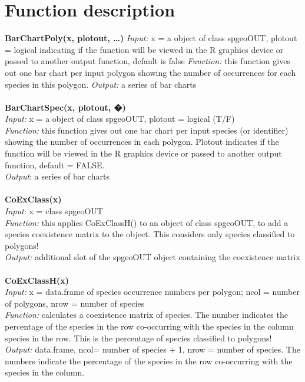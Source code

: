 \documentclass[a4paper,titlepage,11pt]{scrreprt}
\begin{document}
\chapter{Function description}
\textbf{BarChartPoly(x, plotout, \dots)}
\textit{Input:} x = a object of class spgeoOUT, plotout = logical indicating if the function will be viewed in the R graphics device or passed to another output function, default is false
\textit{Function:} this function gives out one bar chart per input polygon showing the number of occurrences for each species in this polygon.
\textit{Output:} a series of bar charts\\
\\
\textbf{BarChartSpec(x, plotout, �)}\\
\textit{Input:} x = a object of class spgeoOUT, plotout = logical (T/F)\\
\textit{Function:} this function gives out one bar chart per input species (or identifier) showing the number of occurrences in each polygon. Plotout indicates if the function will be viewed in the R graphics device or passed to another output function, default = FALSE.\\
\textit{Output}: a series of bar charts\\
\\
\textbf{CoExClass(x)}\\
\textit{Input:} x = class spgeoOUT\\
\textit{Function:} this applies CoExClassH() to an object of class spgeoOUT, to add a species coexistence matrix to the object. This considers only species classified to polygons!\\
\textit{Output:} additional slot of the spgeoOUT object containing the coexistence matrix\\
\\
\textbf{CoExClassH(x)}\\
\textit{Input:} x = data.frame of species occurrence numbers per polygon; ncol = number of polygons, nrow = number of species\\
\textit{Function:} calculates a coexistence matrix of species. The number indicates the percentage of the species in the row co-occurring with the species in the column species in the row. This is the percentage of species classified to polygons!\\
\textit{Output:} data.frame, ncol= number of species + 1, nrow = number of species. The numbers indicate the percentage of the species in the row co-occurring with the species in the column.\\
\end{document}

